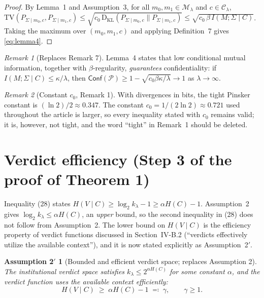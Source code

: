 \documentclass[10pt,a4paper]{article}
\newtheorem*{assumptionB}{Assumption 2$'$}
\theoremstyle{remark}
\newtheorem*{remark}{Remark}
\newcommand{\Conf}{\mathsf{Conf}}
\newcommand{\TV}{\mathrm{TV}}
\newcommand{\KL}{\mathrm{D}_{\mathrm{KL}}}
\newcommand{\cP}{\mathcal{P}}
\newcommand{\IMS}{I(M;\Sigma\mid C)}
\begin{document}
\begin{proof}
By Lemma~1 and Assumption~3, for all $m_0,m_1\in\mathcal M_\lambda$ and
$c\in\mathcal C_\lambda$,
$\TV(P_{\Sigma\mid m_0,c},P_{\Sigma\mid m_1,c})
\le\sqrt{c_0\,\KL(P_{\Sigma\mid m_0,c}\|P_{\Sigma\mid m_1,c})}
\le\sqrt{c_0\,\beta\,\IMS}$.
Taking the maximum over $(m_0,m_1,c)$ and applying Definition~7 gives
\eqref{eq:lemma4}.
\end{proof}

\begin{remark}[Replaces Remark 7]
Lemma~4 states that low conditional mutual information, together with
$\beta$-regularity, \emph{guarantees} confidentiality: if
$\IMS\le\kappa/\lambda$, then
$\Conf(\cP)\ge 1-\sqrt{c_0\beta\kappa/\lambda}\to 1$ as
$\lambda\to\infty$.
\end{remark}

\begin{remark}[Constant $c_0$, Remark 1]
With divergences in bits, the tight Pinsker constant is $(\ln 2)/2\approx0.347$.
The constant $c_0=1/(2\ln 2)\approx0.721$ used throughout the article
is larger, so every inequality stated with $c_0$ remains valid; it is,
however, not tight, and the word ``tight'' in Remark~1 should be deleted.
\end{remark}

\section{Verdict efficiency (Step 3 of the proof of Theorem 1)}

Inequality (28) states $H(V\mid C)\ge\log_2 k_\lambda-1\ge\alpha H(C)-1$.
Assumption~2 gives $\log_2 k_\lambda\le\alpha H(C)$, an \emph{upper} bound, so
the second inequality in (28) does not follow from Assumption~2. The lower
bound on $H(V\mid C)$ is the efficiency property of verdict functions
discussed in Section~IV-B.2 (``verdicts effectively utilize the available
context''), and it is now stated explicitly as Assumption~2$'$.

\begin{assumptionB}[Bounded and efficient verdict space; replaces Assumption 2]
The institutional verdict space satisfies $k_\lambda\le 2^{\alpha H(C)}$
for some constant $\alpha$, and the verdict function uses the available
context efficiently:
\begin{equation*}\tag{11$'$}\label{eq:eff}
H(V\mid C)\;\ge\;\alpha H(C)-1 \;\eqqcolon\; \gamma, \qquad \gamma\ge 1 .
\end{equation*}
\end{assumptionB}
\end{document}
